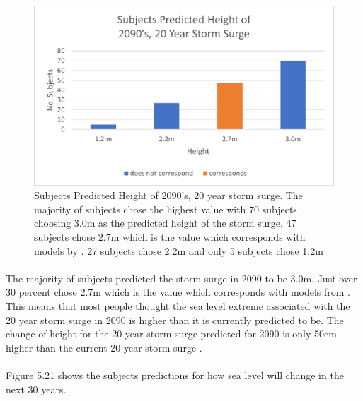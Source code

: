 \begin{figure}[H]
    \centering
    \includegraphics{fig_results/2090s 20yr ss answers.png}
    \caption{Subjects Predicted Height of 2090's, 20 year storm surge. The majority of subjects chose the highest value with 70 subjects choosing 3.0m as the predicted height of the storm surge. 47 subjects chose 2.7m which is the value which corresponds with models by \cite{kartverket_se_2021}. 27 subjects chose 2.2m and only 5 subjects chose 1.2m}
    \label{fig:2090-stormsurge-answers}
\end{figure}
\paragraph{}
The majority of subjects predicted the storm surge in 2090 to be 3.0m. Just over 30 percent chose 2.7m which is the value which corresponds with models from \cite{kartverket_se_2021}. This means that most people thought the sea level extreme associated with the 20 year storm surge in 2090 is higher than it is currently predicted to be. The change of height for the 20 year storm surge predicted for 2090 is only 50cm higher than the current 20 year storm surge \cite{kartverket_se_2021}. 
\paragraph{}
Figure 5.21 shows the subjects predictions for how sea level will change in the next 30 years. 

